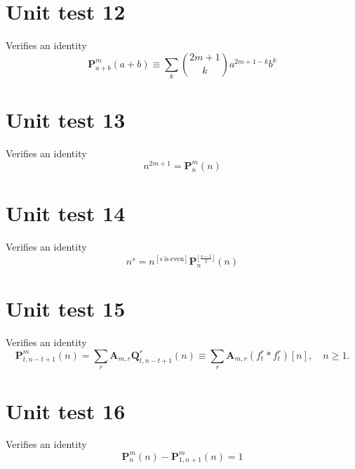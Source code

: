 \documentclass[12pt, letterpaper]{amsart}
\theoremstyle{definition}
\theoremstyle{remark}
\numberwithin{equation}{section}
\begin{document}
\section{Unit test 12}
Verifies an identity
\begin{equation*}
\mathbf{P}^{m}_{a+b}(a+b) \equiv \sum_{k} \binom{2m+1}{k} a^{2m+1-k} b^k
\end{equation*}
\section{Unit test 13}
Verifies an identity
\begin{equation*}
n^{2m+1} = \mathbf{P}^{m}_{n}(n)
\end{equation*}
\section{Unit test 14}
Verifies an identity
\begin{equation*}
n^s
= n^{[s \ \mathrm{is} \ \mathrm{even}]} \mathbf{P}^{\lfloor \tfrac{s-1}{2} \rfloor}_{n}(n)
\end{equation*}
\section{Unit test 15}
Verifies an identity
\begin{equation*}
\mathbf{P}^{m}_{t,n-t+1}(n)
=\sum\limits_{r}\mathbf{A}_{m,r} \mathbf{Q}_{t,n-t+1}^r(n)
\equiv \sum\limits_{r}\mathbf{A}_{m,r} (f_{t}^{r} \ast f_{t}^{r})[n], \quad n\geq 1.
\end{equation*}
\section{Unit test 16}
Verifies an identity
\begin{equation*}
\mathbf{P}^{m}_{n}(n) - \mathbf{P}^{m}_{1,n+1}(n) = 1
\end{equation*}
\end{document}
